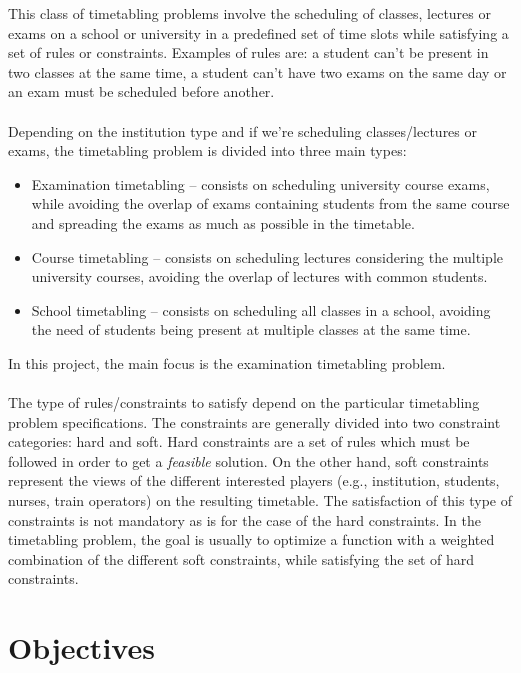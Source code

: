 This class of timetabling problems involve the scheduling of classes, lectures or exams on a school or university in a predefined set of time slots while satisfying a set of rules or constraints. Examples of rules are: a student can't be present in two classes at the same time, a student can't have two exams on the same day or an exam must be scheduled before another.\\
\\
Depending on the institution type and if we're scheduling classes/lectures or exams, the timetabling problem is divided into three main types:\\
\begin{itemize}
	\item Examination timetabling -- consists on scheduling university course exams, while avoiding the overlap of exams containing students from the same course and spreading the exams as much as possible in the timetable.
	\item Course timetabling -- consists on scheduling lectures considering the multiple university courses, avoiding the overlap of lectures with common students.
	\item School timetabling -- consists on scheduling all classes in a school, avoiding the need of students being present at multiple classes at the same time.
\end{itemize}
In this project, the main focus is the examination timetabling problem. \\
\\
The type of rules/constraints to satisfy depend on the particular timetabling problem specifications. The constraints are generally divided into two constraint categories: hard and soft. Hard constraints are a set of rules which must be followed in order to get a \textit{feasible} solution. On the other hand, soft constraints represent the views of the different interested players (e.g., institution, students, nurses, train operators) on the resulting timetable. The satisfaction of this type of constraints is not mandatory as is for the case of the hard constraints. In the timetabling problem, the goal is usually to optimize a function with a weighted combination of the different soft constraints, while satisfying the set of hard constraints. 

\section{Objectives}
\label{section:Objts}


